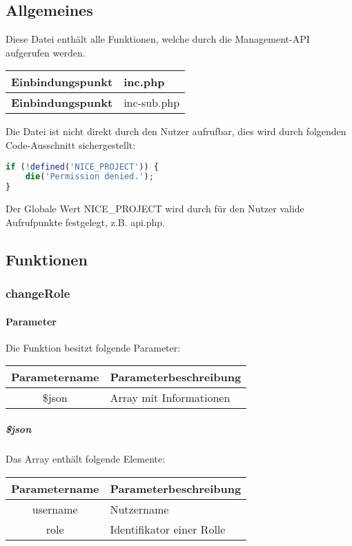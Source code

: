 \subsection{Allgemeines} Diese Datei enthält alle Funktionen, welche durch die Management-API aufgerufen werden.
\begin{table}[H]
	\begin{tabular}{|c|p{11cm}|}
		\hline
		\textbf{Einbindungspunkt} & inc.php \\ \hline
		\textbf{Einbindungspunkt} & inc-sub.php \\ \hline
	\end{tabular}
\end{table}
Die Datei ist nicht direkt durch den Nutzer aufrufbar, dies wird durch folgenden Code-Ausschnitt sichergestellt:
\begin{lstlisting}[language=php]
if (!defined('NICE_PROJECT')) {
	die('Permission denied.');
}
\end{lstlisting}
Der Globale Wert {\glqq NICE\_PROJECT\grqq} wird durch für den Nutzer valide Aufrufpunkte festgelegt, z.B. {\glqq api.php\grqq}.
\newpage
\subsection{Funktionen}
\subsubsection{changeRole}
\paragraph{Parameter} Die Funktion besitzt folgende Parameter:
\begin{table}[H]
	\begin{tabular}{|c|p{11cm}|}
		\hline
		\textbf{Parametername} & \textbf{Parameterbeschreibung} \\ \hline
		\$json & Array mit Informationen \\ \hline
	\end{tabular}
\end{table}
\subparagraph{\$json}Das Array enthält folgende Elemente:
\begin{table}[H]
	\begin{tabular}{|c|p{11cm}|}
		\hline
		\textbf{Parametername} & \textbf{Parameterbeschreibung} \\ \hline
		username & Nutzername \\ \hline
		role     & Identifikator einer Rolle \\ \hline
	\end{tabular}
\end{table}
